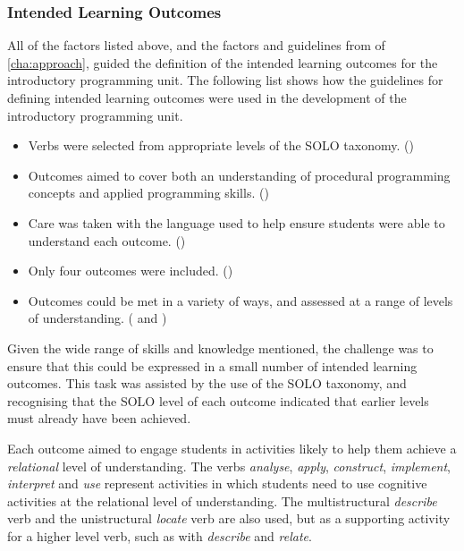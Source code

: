

\subsubsection{Intended Learning Outcomes} %
\label{ssub:intro_intended_learning_outcomes}

All of the factors listed above, and the factors and guidelines from  of \cref{cha:approach}, guided the definition of the intended learning outcomes for the introductory programming unit. The following list shows how the guidelines for defining intended learning outcomes were used in the development of the introductory programming unit.

\begin{itemize}[noitemsep,nolistsep]
	\item Verbs were selected from appropriate levels of the SOLO taxonomy. () 
	\item Outcomes aimed to cover both an understanding of procedural programming concepts and applied programming skills. ()
	\item Care was taken with the language used to help ensure students were able to understand each outcome. ()
	\item Only four outcomes were included. ()
	\item Outcomes could be met in a variety of ways, and assessed at a range of levels of understanding. ( and )
\end{itemize}

Given the wide range of skills and knowledge mentioned, the challenge was to ensure that this could be expressed in a small number of intended learning outcomes. This task was assisted by the use of the SOLO taxonomy, and recognising that the SOLO level of each outcome indicated that earlier levels must already have been achieved.

Each outcome aimed to engage students in activities likely to help them achieve a \emph{relational} level of understanding. The verbs \emph{analyse}, \emph{apply}, \emph{construct}, \emph{implement}, \emph{interpret} and \emph{use} represent activities in which students need to use cognitive activities at the relational level of understanding. The multistructural \emph{describe} verb and the unistructural \emph{locate} verb are also used, but as a supporting activity for a higher level verb, such as with \emph{describe} and \emph{relate}.

